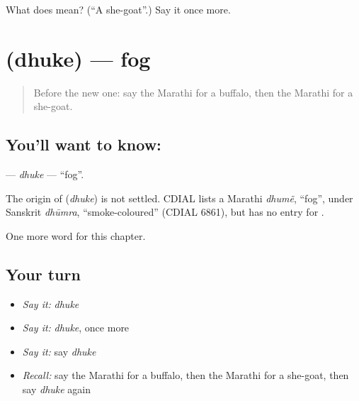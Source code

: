 \begin{tcolorbox}[breakable,colback=teal!4,colframe=teal!35!black,title={Before you move on}]
What does  mean? (\textquotedblleft{}A she-goat\textquotedblright{}.) Say it once more.
\end{tcolorbox}
\section[\texorpdfstring{\mr{धुके} (dhuke)}{धुके (dhuke)}]{ (dhuke) — fog}

\label{lesson:MR-C218-dhuke}



\begin{quote}
Before the new one: say the Marathi for a buffalo, then the Marathi for a she-goat.
\end{quote}

\subsection*{You'll want to know: }
\textbf{} — \emph{dhuke} — \textquotedblleft{}fog\textquotedblright{}.

\begin{cousinweb}
The origin of \textbf{} (\emph{dhuke}) is not settled. CDIAL lists a Marathi \emph{dhumẽ}, \textquotedblleft{}fog\textquotedblright{}, under Sanskrit \emph{dhūmra}, \textquotedblleft{}smoke-coloured\textquotedblright{} (CDIAL 6861), but has no entry for \textbf{}.
\end{cousinweb}

\begin{grammarlens}[title={What you've built}]
One more word for this chapter.
\end{grammarlens}

\subsection*{Your turn}
\begin{itemize}
\raggedright
  \item \emph{Say it:} \emph{dhuke}
  \item \emph{Say it:} \emph{dhuke}, once more
  \item \emph{Say it:} say \emph{dhuke}
  \item \emph{Recall:} say the Marathi for a buffalo, then the Marathi for a she-goat, then say \emph{dhuke} again
\end{itemize}

